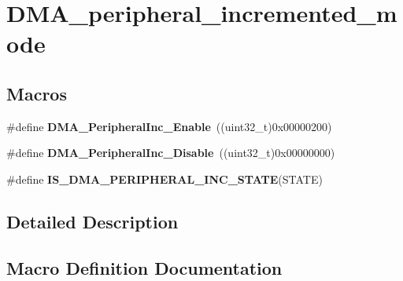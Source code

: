 \hypertarget{group___d_m_a__peripheral__incremented__mode}{}\section{D\+M\+A\+\_\+peripheral\+\_\+incremented\+\_\+mode}
\label{group___d_m_a__peripheral__incremented__mode}
\subsection*{Macros}
\begin{DoxyCompactItemize}
\item 
\hypertarget{group___d_m_a__peripheral__incremented__mode_gaf7921ea423fb60701a091c508cd0f33a}{}\#define {\bfseries D\+M\+A\+\_\+\+Peripheral\+Inc\+\_\+\+Enable}~((uint32\+\_\+t)0x00000200)\label{group___d_m_a__peripheral__incremented__mode_gaf7921ea423fb60701a091c508cd0f33a}

\item 
\hypertarget{group___d_m_a__peripheral__incremented__mode_ga0fe3ff9c67bec802dd239fd17c3dbd31}{}\#define {\bfseries D\+M\+A\+\_\+\+Peripheral\+Inc\+\_\+\+Disable}~((uint32\+\_\+t)0x00000000)\label{group___d_m_a__peripheral__incremented__mode_ga0fe3ff9c67bec802dd239fd17c3dbd31}

\item 
\#define {\bfseries I\+S\+\_\+\+D\+M\+A\+\_\+\+P\+E\+R\+I\+P\+H\+E\+R\+A\+L\+\_\+\+I\+N\+C\+\_\+\+S\+T\+A\+T\+E}(S\+T\+A\+T\+E)
\end{DoxyCompactItemize}


\subsection{Detailed Description}


\subsection{Macro Definition Documentation}
\hypertarget{group___d_m_a__peripheral__incremented__mode_ga28762105b3f567c16ba79a47e68ff0fa}{}
